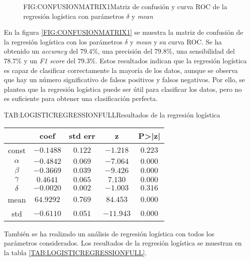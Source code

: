 \begin{figure}[Matriz de confusión y curva ROC de la regresión logística con parámetros $\delta$ y \textit{mean}]{FIG:CONFUSIONMATRIX1}{Matriz de confusión y curva ROC de la regresión logística con parámetros $\delta$ y \textit{mean}}
     \quad
\end{figure}


En la figura \ref{FIG:CONFUSIONMATRIX1} se muestra la matriz de confusión de la regresión logística con los parámetros $\delta$ y \textit{mean} y su curva \ac{ROC}.
Se ha obtenido un \textit{accuracy} del $79.4\%$, una precisión del $79.8\%$, una sensibilidad del $78.7\%$ y un \textit{F1 score} del $79.3\%$. Estos resultados indican que la regresión logística es capaz de clasificar correctamente la mayoría de los datos, aunque se observa que hay un número significativo de falsos positivos y falsos negativos. Por ello, se plantea que la regresión logística puede ser útil para clasificar los datos, pero no es suficiente para obtener una clasificación perfecta.

\begin{table}[Resultados de la regresión logística]{TAB:LOGISTICREGRESSIONFULL}{Resultados de la regresión logística}
    \begin{tabular}{|c|c|c|c|c|}
        \hline
        & coef & std err & z & P>|z| \\
        \hline
        const & $-0.1488$ & $0.122$ & $-1.218$ & $0.223$ \\
        $\alpha$ & $-0.4842$ & $0.069$ & $-7.064$ & $0.000$ \\
        $\beta$ & $-0.3669$ & $0.039$ & $-9.426$ & $0.000$ \\
        $\gamma$ & $0.4641$ & $0.065$ & $7.130$ & $0.000$ \\
        $\delta$ & $-0.0020$ & $0.002$ & $-1.003$ & $0.316$ \\
        mean & $64.9292$ & $0.769$ & $84.453$ & $0.000$ \\
        std & $-0.6110$ & $0.051$ & $-11.943$ & $0.000$ \\
        \hline
    \end{tabular}
\end{table}

También se ha realizado un análisis de regresión logística con todos los parámetros considerados. Los resultados de la regresión logística se muestran en la tabla \ref{TAB:LOGISTICREGRESSIONFULL}.

